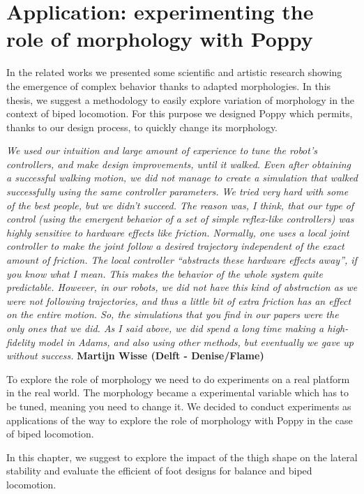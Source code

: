
\chapter{Application: experimenting the role of morphology with Poppy} %
\label{cha:exploring_the_role_of_morphology}


In the related works we presented some scientific and artistic research showing the emergence of complex behavior thanks to adapted morphologies. In this thesis, we suggest a methodology to easily explore variation of morphology in the context of biped locomotion.
For this purpose we designed Poppy which permits, thanks to our design process, to quickly change its morphology.


\emph{We used our intuition and large amount of experience to tune the robot’s controllers, and make design improvements, until it walked. Even after obtaining a successful walking motion, we did not manage to create a simulation that walked successfully using the same controller parameters. We tried very hard with some of the best people, but we didn’t succeed. The reason was, I think, that our type of control (using the emergent behavior of a set of simple reflex-like controllers) was highly sensitive to hardware effects like friction. Normally, one uses a local joint controller to make the joint follow a desired trajectory independent of the exact amount of friction. The local controller “abstracts these hardware effects away”, if you know what I mean. This makes the behavior of the whole system quite predictable. However, in our robots, we did not have this kind of abstraction as we were not following trajectories, and thus a little bit of extra friction has an effect on the entire motion.
So, the simulations that you find in our papers were the only ones that we did. As I said above, we did spend a long time making a high-fidelity model in Adams, and also using other methods, but eventually we gave up without success.}
\textbf{Martijn Wisse (Delft - Denise/Flame)}


To explore the role of morphology we need to do experiments on a real platform in the real world. The morphology became a experimental variable which has to be tuned, meaning you need to change it.
We decided to conduct experiments as applications of the way to explore the role of morphology with Poppy in the case of biped locomotion.

In this chapter,  we suggest to explore the impact of the thigh shape on the lateral stability and evaluate the efficient of foot designs for balance and biped locomotion.

